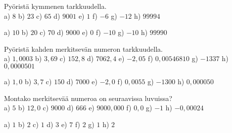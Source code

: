 \begin{tehtava}
Pyöristä kymmenen tarkkuudella. \\
a) $8$ \qquad
b) $23$ \qquad
c) $65$ \qquad
d) $9001$ \qquad
e) $1$ \qquad
f) $-6$ \qquad
g) $-12$ \qquad
h) $99994$
\begin{vastaus}
a) $10$ \qquad
b) $20$ \qquad
c) $70$ \qquad
d) $9000$ \qquad
e) $0$ \qquad
f) $-10$ \qquad
g) $-10$ \qquad
h) $99990$
\end{vastaus}
\end{tehtava}

\begin{tehtava}
Pyöristä kahden merkitsevän numeron tarkkuudella. \\
a) $1,0003$ \qquad
b) $3,69$ \qquad
c) $152,8$ \qquad
d) $7062,4$ \qquad
e) $-2,05$ \qquad
f) $0,00546810$ \qquad
g) $-1337$ \qquad
h) $0,0000501$
\begin{vastaus}
a) $1,0$ \qquad
b) $3,7$ \qquad
c) $150$ \qquad
d) $7000$ \qquad
e) $-2,0$ \qquad
f) $0,0055$ \qquad
g) $-1300$ \qquad
h) $0,000050$
\end{vastaus}
\end{tehtava}

\begin{tehtava}
Montako merkitsevää numeroa on seuraavissa luvuissa? \\
a) $5$ \qquad
b) $12,0$ \qquad
c) $9000$ \qquad
d) $666$ \qquad
e) $9000,000$ \qquad
f) $0,0$ \qquad
g) $-1$ \qquad
h) $-0,00024$
\begin{vastaus}
a) $1$ \qquad
b) $2$ \qquad
c) $1$ \qquad
d) $3$ \qquad
e) $7$ \qquad
f) $2$ \qquad
g) $1$ \qquad
h) $2$
\end{vastaus}
\end{tehtava}
